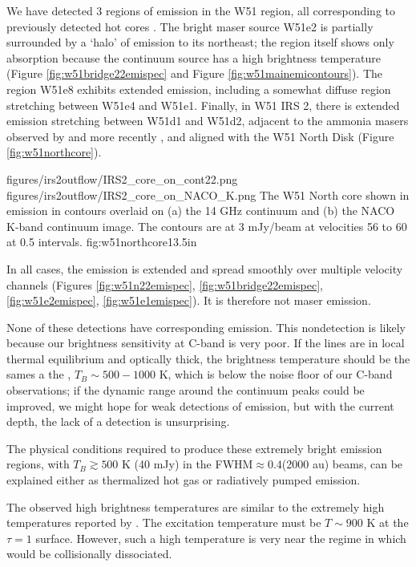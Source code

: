 We have detected 3 regions of \twotwo emission in the W51 region, all
corresponding to previously detected hot \ammonia cores
\citep{Zhang1997a,Goddi2015a}.  The bright
maser source W51e2 is partially surrounded by a `halo' of \formaldehyde \twotwo
emission to its northeast; the \hchii region itself shows only \twotwo
absorption because the continuum source has a high brightness temperature
(Figure \ref{fig:w51bridge22emispec} and Figure \ref{fig:w51mainemicontours}).
The \hchii region W51e8 exhibits extended \twotwo emission, including a
somewhat
diffuse region stretching between W51e4 and W51e1.  Finally, in W51 IRS 2,
there is extended \twotwo emission stretching between W51d1 and W51d2, adjacent
to the ammonia masers observed by \citet{Zhang1995a} and more recently
\citet{Goddi2015a}, and aligned with the
\citet{Zapata2010a} W51 North Disk (Figure \ref{fig:w51northcore}).

\FigureTwo
{figures/irs2outflow/IRS2_core_on_cont22.png}
{figures/irs2outflow/IRS2_core_on_NACO_K.png}
{The W51 North core shown in emission in contours overlaid on (a) the 14 GHz
continuum and (b) the NACO K-band continuum image.  The contours are at 3
mJy/beam at velocities 56 to 60 \kms at 0.5 \kms intervals.
}
{fig:w51northcore}{1}{3.5in}

In all cases, the emission is extended and spread smoothly over multiple
velocity channels (Figures \ref{fig:w51n22emispec},
\ref{fig:w51bridge22emispec}, \ref{fig:w51e2emispec}, \ref{fig:w51e1emispec}).
It is therefore not maser emission.

None of these detections have corresponding \oneone emission.  This
nondetection is likely because our brightness sensitivity at C-band is very
poor.  If the
\formaldehyde lines are in local thermal equilibrium and optically thick, the
\oneone brightness temperature should be the sames a the \twotwo,
$T_B\sim500-1000$ K, which is below the noise floor of our C-band observations;
if the dynamic range around the continuum peaks could be improved, we might
hope for weak detections of \oneone emission, but with the current depth, the
lack of a detection is unsurprising.

The physical conditions required to produce these extremely bright emission
regions, with $T_B \gtrsim 500$ K (40 mJy) in the FWHM$\approx0.4$\arcsec (2000
au) beams, can be explained either as thermalized hot gas or radiatively pumped
emission.

The observed high brightness temperatures are similar to the extremely high
temperatures reported by \citet{Zapata2010a}.  The excitation temperature must
be $T\sim900$ K at the \formaldehyde \twotwo $\tau=1$ surface.  However, such a
high temperature is very near the regime in which \formaldehyde would be
collisionally dissociated.

